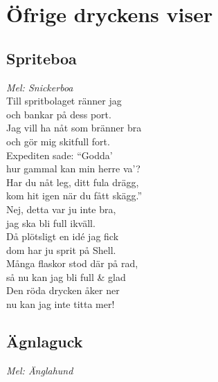\documentclass[twoside, openright]{report}
\begin{document}
\chapter{Öfrige dryckens viser}

\section{Spriteboa} 
\textit{Mel: Snickerboa}\\

Till spritbolaget ränner jag\\
och bankar på dess port.\\
Jag vill ha nåt som bränner bra\\
och gör mig skitfull fort.\\
Expediten sade: ``Godda'\\
hur gammal kan min herre va'?\\
Har du nåt leg, ditt fula drägg,\\
kom hit igen när du fått skägg.''\\

Nej, detta var ju inte bra,\\
jag ska bli full ikväll.\\
Då plötsligt en idé jag fick\\
dom har ju sprit på Shell.\\
Många flaskor stod där på rad,\\
så nu kan jag bli full \& glad\\
Den röda drycken åker ner\\
nu kan jag inte titta mer!

\section{Ägnlaguck} 
\textit{Mel: Änglahund}\\
\end{document}

